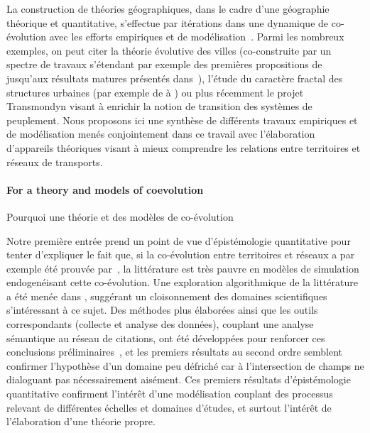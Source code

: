 La construction de théories géographiques, dans le cadre d'une géographie théorique et quantitative, s'effectue par itérations dans une dynamique de co-évolution avec les efforts empiriques et de modélisation~\cite{livet2010}. Parmi les nombreux exemples, on peut citer la théorie évolutive des villes (co-construite par un spectre de travaux s'étendant par exemple des premières propositions de \cite{pumain1997pour} jusqu'aux résultats matures présentés dans~\cite{pumain2012multi}), l'étude du caractère fractal des structures urbaines (par exemple de \cite{frankhauser1998fractal} à \cite{frankhauser2008fractal}) ou plus récemment le projet Transmondyn \cite{sanders2017peupler} visant à enrichir la notion de transition des systèmes de peuplement. Nous proposons ici une synthèse de différents travaux empiriques et de modélisation menés conjointement dans ce travail avec l'élaboration d'appareils théoriques visant à mieux comprendre les relations entre territoires et réseaux de transports.




\paragraph{For a theory and models of coevolution}{Pourquoi une théorie et des modèles de co-évolution}


Notre première entrée prend un point de vue d'épistémologie quantitative pour tenter d'expliquer le fait que, si la co-évolution entre territoires et réseaux a par exemple été prouvée par~\cite{bretagnolle:tel-00459720}, la littérature est très pauvre en modèles de simulation endogenéisant cette co-évolution. Une exploration algorithmique de la littérature a été menée dans \cite{raimbault2015models}, suggérant un cloisonnement des domaines scientifiques s'intéressant à ce sujet. Des méthodes plus élaborées ainsi que les outils correspondants (collecte et analyse des données), couplant une analyse sémantique au réseau de citations, ont été développées pour renforcer ces conclusions préliminaires~\cite{raimbault2016indirect}, et les premiers résultats au second ordre semblent confirmer l'hypothèse d'un domaine peu défriché car à l'intersection de champs ne dialoguant pas nécessairement aisément. Ces premiers résultats d'épistémologie quantitative confirment l'intérêt d'une modélisation couplant des processus relevant de différentes échelles et domaines d'études, et surtout l'intérêt de l'élaboration d'une théorie propre.


